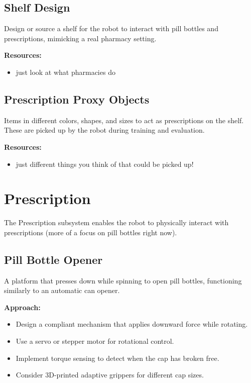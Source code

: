 \documentclass[11pt]{article}
\begin{document}
\subsection{Shelf Design}
Design or source a shelf for the robot to interact with pill bottles and prescriptions, mimicking a real pharmacy setting.

\textbf{Resources:}
\begin{itemize}[nosep]
    \item just look at what pharmacies do
\end{itemize}

\subsection{Prescription Proxy Objects}
Items in different colors, shapes, and sizes to act as prescriptions on the shelf. These are picked up by the robot during training and evaluation.

\textbf{Resources:}
\begin{itemize}[nosep]
    \item just different things you think of that could be picked up!
\end{itemize}

\section{Prescription}
\label{sec:prescription}

The Prescription subsystem enables the robot to physically interact with prescriptions (more of a focus on pill bottles right now).

\subsection{Pill Bottle Opener}
A platform that presses down while spinning to open pill bottles, functioning similarly to an automatic can opener.

\textbf{Approach:}
\begin{itemize}[nosep]
    \item Design a compliant mechanism that applies downward force while rotating.
    \item Use a servo or stepper motor for rotational control.
    \item Implement torque sensing to detect when the cap has broken free.
    \item Consider 3D-printed adaptive grippers for different cap sizes.
\end{itemize}
\end{document}
